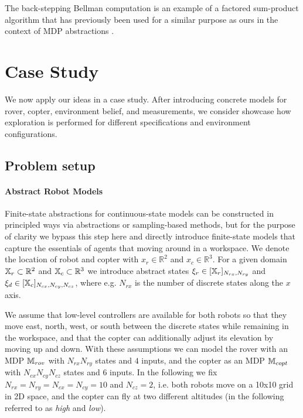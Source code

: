 \documentclass[conference]{IEEEtran}
\renewcommand{\cite}[1]{\citep{#1}}
\begin{document}
The back-stepping Bellman computation is an example of a factored sum-product algorithm \cite{Kschischang2001} that has previously been used for a similar purpose as ours in the context of MDP abstractions \cite{EsmaeilZadehSoudjani2017}.

 

\section{Case Study}
\label{sec:casestudy}

We now apply our ideas in a case study. After introducing concrete models for rover, copter, environment belief, and measurements, we consider showcase how exploration is performed for different specifications and environment configurations.

\subsection{Problem setup}

\paragraph{Abstract Robot Models}

Finite-state abstractions for continuous-state models can be constructed in principled ways via abstractions or sampling-based methods, but for the purpose of clarity we bypass this step here and directly introduce finite-state models that capture the essentials of agents that moving around in a workspace. We denote the location of robot and copter with $x_r \in \mathbb{R}^2$ and $x_c \in \mathbb{R}^3$. For a given domain $\mathbb{X}_r \subset \mathbb{R}^2$ and $\mathbb{X}_c \subset \mathbb{R}^3$ we introduce abstract states $\xi_r \in [\mathbb{X}_r]_{N_{rx}, N_{ry}}$ and $\xi_d \in [\mathbb{X}_c]_{N_{cx}, N_{cy}, N_{cz}}$, where e.g. $N_{rx}$ is the number of discrete states along the $x$ axis. 

We assume that low-level controllers are available for both robots so that they move east, north, west, or south between the discrete states while remaining in the workspace, and that the copter can additionally adjust its elevation by moving up and down. With these assumptions we can model the rover with an MDP $\mathbb{M}_{rov}$ with $N_{rx} N_{ry}$ states and $4$ inputs, and the copter as an MDP $\mathbb{M}_{copt}$ with $N_{cx} N_{cy} N_{cz}$ states and $6$ inputs. In the following we fix $N_{rx} = N_{ry} = N_{cx} = N_{cy} = 10$ and $N_{cz} = 2$, i.e. both robots move on a 10x10 grid in 2D space, and the copter can fly at two different altitudes (in the following referred to as \emph{high} and \emph{low}).
\end{document}
